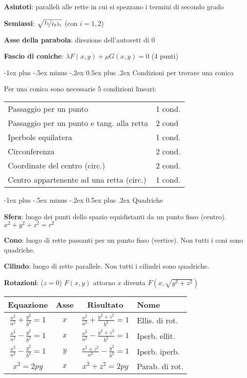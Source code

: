 \documentclass[10pt,landscape]{article}
\makeatletter
\renewcommand{\section}{\@startsection{section}{1}{0mm}%
                                {-1ex plus -.5ex minus -.2ex}%
                                {0.5ex plus .2ex}%
                                {\normalfont\large\bfseries}}
\makeatother
\begin{document}
\begin{multicols}{3}
\textbf{Asintoti}: paralleli alle rette in cui si spezzano i termini di secondo grado

\textbf{Semiassi}: $\sqrt{\nicefrac{I_3}{I_2\lambda_i}}$ (con $i=1,2$)

\textbf{Asse della parabola}: direzione dell'autovett di 0

\textbf{Fascio di coniche}: $\lambda F(x,y) + \mu G(x,y) = 0$ (4 punti)

\section{Condizioni per trovare una conica}

Per una conica sono necessarie 5 condizioni lineari:
\begin{tabular}{ll}
	Passaggio per un punto & 1 cond. \\
	Passaggio per un punto e tang. alla retta & 2 cond \\
	Iperbole equilatera & 1 cond. \\
	Circonferenza & 2 cond. \\
	Coordinate del centro (circ.) & 2 cond. \\
	Centro appartenente ad una retta (circ.) & 1 cond. \\
\end{tabular}

\section{Quadriche}

\textbf{Sfera}: luogo dei punti dello spazio equidistanti da un punto fisso (centro). $x^2+y^2+z^2=r^2$

\textbf{Cono}: luogo di rette passanti per un punto fisso (vertice). Non tutti i coni sono quadriche.

\textbf{Cilindo}: luogo di rette parallele. Non tutti i cilindri sono quadriche.

\textbf{Rotazioni}: ($z = 0$) $F(x, y)$ attorno $x$ diventa $F(x, \sqrt{y^2+z^2})$

\begin{tabular}{cccl}
	\textbf{Equazione} & \textbf{Asse} & \textbf{Risultato} & \textbf{Nome} \\
	\hline
	$\frac{x^2}{a^2}+\frac{y^2}{b^2}=1$ & $x$ & $\frac{x^2}{a^2}+\frac{y^2+z^2}{b^2}=1$ & Ellis. di rot. \\
	$\frac{x^2}{a^2}-\frac{y^2}{b^2}=1$ & $x$ & $\frac{x^2}{a^2}-\frac{y^2+z^2}{b^2}=1$ & Iperb. ellit. \\
	$\frac{x^2}{a^2}-\frac{y^2}{b^2}=1$ & $y$ & $\frac{x^2+z^2}{a^2}-\frac{y^2}{b^2}=1$ & Iperb. iperb. \\
	$x^2=2py$ & $x$ & $x^2+z^2=2py$ & Parab. di rot.
\end{tabular}


\end{multicols}
\end{document}
